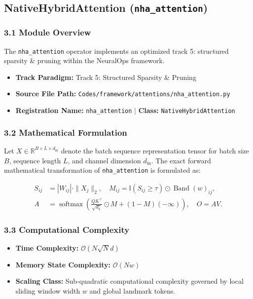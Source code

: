 \subsection{NativeHybridAttention (\texttt{nha\_attention})}
\label{sec:app_module_nha\_attention}

\subsubsection*{3.1 Module Overview}
The \texttt{nha\_attention} operator implements an optimized track 5: structured sparsity \& pruning within the NeuralOps framework.
\begin{itemize}
    \item \textbf{Track Paradigm:} Track 5: Structured Sparsity & Pruning
    \item \textbf{Source File Path:} \texttt{Codes/framework/attentions/nha\_attention.py}
    \item \textbf{Registration Name:} \texttt{nha\_attention} $\mid$ \textbf{Class:} \texttt{NativeHybridAttention}
\end{itemize}

\subsubsection*{3.2 Mathematical Formulation}
Let $X \in \mathbb{R}^{B \times L \times d_{\text{in}}}$ denote the batch sequence representation tensor for batch size $B$, sequence length $L$, and channel dimension $d_{\text{in}}$. The exact forward mathematical transformation of \texttt{nha\_attention} is formulated as:

\begin{align}
S_{ij} &= |W_{ij}| \cdot \|X_j\|_2, \quad M_{ij} = \mathbb{I}(S_{ij} \ge \tau) \odot \operatorname{Band}(w)_{ij}, \\
A &= \operatorname{softmax}\left(\frac{Q K^\top}{\sqrt{d_k}} \odot M + (1 - M)(-\infty)\right), \quad O = A V.
\end{align}


\subsubsection*{3.3 Computational Complexity}
\begin{itemize}
    \item \textbf{Time Complexity:} $\mathcal{O}(N \sqrt{N} d)$
    \item \textbf{Memory State Complexity:} $\mathcal{O}(N w)$
    \item \textbf{Scaling Class:} Sub-quadratic computational complexity governed by local sliding window width $w$ and global landmark tokens.
\end{itemize}

